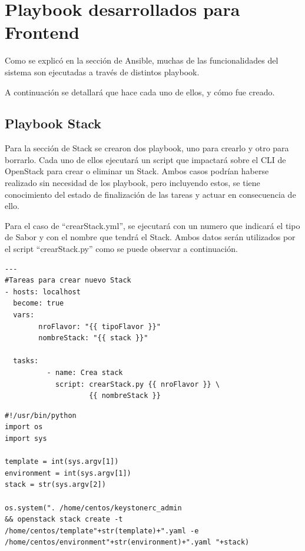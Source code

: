 \documentclass[12pt,a4paper,oneside]{book}
\begin{document}
\section{Playbook desarrollados para Frontend}
\label{seccC.5}

Como se explicó en la sección de Ansible, muchas de las funcionalidades del sistema son ejecutadas a través de distintos playbook.

\vspace{0.5cm}

A continuación se detallará que hace cada uno de ellos, y cómo fue creado.

\subsection{Playbook Stack}
\label{subseccC.5.1}
Para la sección de Stack se crearon dos playbook, uno para crearlo y otro para borrarlo. Cada uno de ellos ejecutará un script que impactará sobre el CLI de OpenStack para crear o eliminar un Stack. Ambos casos podrían haberse realizado sin necesidad de los playbook, pero incluyendo estos, se tiene conocimiento del estado de finalización de las tareas y actuar en consecuencia de ello.

\vspace{0.5cm}

Para el caso de ``crearStack.yml'', se ejecutará con un numero que indicará el tipo de Sabor y con el nombre que tendrá el Stack. Ambos datos serán utilizados por el script ``crearStack.py'' como se puede observar a continuación.

\begin{lstlisting}[style=codigobase,  caption= crearStack.yml]
---
#Tareas para crear nuevo Stack
- hosts: localhost
  become: true
  vars:
        nroFlavor: "{{ tipoFlavor }}"
        nombreStack: "{{ stack }}"
               
  tasks:
          - name: Crea stack
            script: crearStack.py {{ nroFlavor }} \ 
                    {{ nombreStack }}
\end{lstlisting}

\vspace{0,5cm}

\begin{lstlisting}[style=codigobase,  caption= crearStack.py]
#!/usr/bin/python
import os
import sys

template = int(sys.argv[1])
environment = int(sys.argv[1])
stack = str(sys.argv[2])

os.system(". /home/centos/keystonerc_admin 
&& openstack stack create -t
/home/centos/template"+str(template)+".yaml -e
/home/centos/environment"+str(environment)+".yaml "+stack)

\end{lstlisting}
\end{document}
